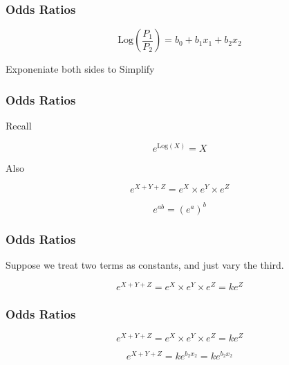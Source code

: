 
\begin{frame}
\frametitle{Odds Ratios}


\[ \mbox{Log} \left( \frac{P_1}{P_2} \right) = b_0 + b_1x_1 +b_2x_2 \]

Exponeniate both sides to Simplify

\end{frame}
\begin{frame}
\frametitle{Odds Ratios}

Recall

\[ e^{\mbox{Log}(X)}  = X \]

Also

\[ e^{X + Y + Z}  = e^{X} \times e^{Y} \times e^{Z} \]

\[e^{ab} = (e^{a})^b \]

\end{frame}
\begin{frame}
\frametitle{Odds Ratios}



Suppose we treat two terms as constants, and just vary the third.

\[ e^{X + Y + Z}  = e^{X} \times e^{Y} \times e^{Z}  = k e^{Z}\]

\end{frame}
\begin{frame}
\frametitle{Odds Ratios}

\[ e^{X + Y + Z}  = e^{X} \times e^{Y} \times e^{Z}  = k e^{Z}\]

\[ e^{X + Y + Z}  = k e^{b_2x_2} = k e^{b_2x_2} \]




\end{frame}
